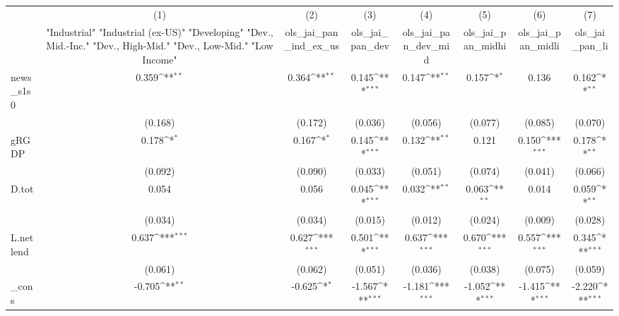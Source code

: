 {
\def\sym#1{\ifmmode^{#1}\else\(^{#1}\)\fi}
\begin{tabular}{l*{7}{c}}
\toprule
            &\multicolumn{1}{c}{(1)}&\multicolumn{1}{c}{(2)}&\multicolumn{1}{c}{(3)}&\multicolumn{1}{c}{(4)}&\multicolumn{1}{c}{(5)}&\multicolumn{1}{c}{(6)}&\multicolumn{1}{c}{(7)}\\
            &\multicolumn{1}{c}{ "Industrial" "Industrial (ex-US)" "Developing" "Dev., Mid.-Inc." "Dev., High-Mid."  "Dev., Low-Mid." "Low Income" }&\multicolumn{1}{c}{ols\_jai\_pan\_ind\_ex\_us}&\multicolumn{1}{c}{ols\_jai\_pan\_dev}&\multicolumn{1}{c}{ols\_jai\_pan\_dev\_mid}&\multicolumn{1}{c}{ols\_jai\_pan\_midhi}&\multicolumn{1}{c}{ols\_jai\_pan\_midli}&\multicolumn{1}{c}{ols\_jai\_pan\_li}\\
\midrule
news\_s1s0   &       0.359\sym{**} &       0.364\sym{**} &       0.145\sym{***}&       0.147\sym{**} &       0.157\sym{*}  &       0.136         &       0.162\sym{**} \\
            &     (0.168)         &     (0.172)         &     (0.036)         &     (0.056)         &     (0.077)         &     (0.085)         &     (0.070)         \\
\addlinespace
gRGDP       &       0.178\sym{*}  &       0.167\sym{*}  &       0.145\sym{***}&       0.132\sym{**} &       0.121         &       0.150\sym{***}&       0.178\sym{**} \\
            &     (0.092)         &     (0.090)         &     (0.033)         &     (0.051)         &     (0.074)         &     (0.041)         &     (0.066)         \\
\addlinespace
D.tot       &       0.054         &       0.056         &       0.045\sym{***}&       0.032\sym{**} &       0.063\sym{**} &       0.014         &       0.059\sym{**} \\
            &     (0.034)         &     (0.034)         &     (0.015)         &     (0.012)         &     (0.024)         &     (0.009)         &     (0.028)         \\
\addlinespace
L.netlend   &       0.637\sym{***}&       0.627\sym{***}&       0.501\sym{***}&       0.637\sym{***}&       0.670\sym{***}&       0.557\sym{***}&       0.345\sym{***}\\
            &     (0.061)         &     (0.062)         &     (0.051)         &     (0.036)         &     (0.038)         &     (0.075)         &     (0.059)         \\
\addlinespace
\_cons      &      -0.705\sym{**} &      -0.625\sym{*}  &      -1.567\sym{***}&      -1.181\sym{***}&      -1.052\sym{***}&      -1.415\sym{***}&      -2.220\sym{***}\\

\end{tabular}}
